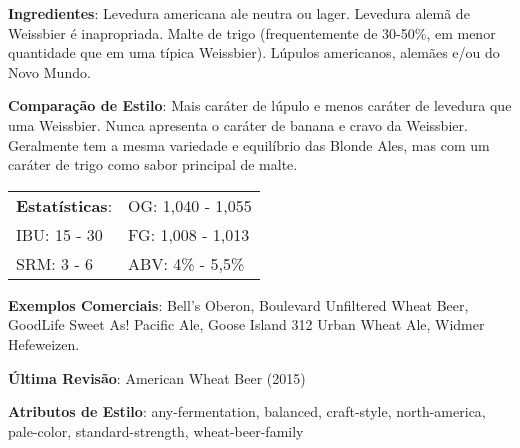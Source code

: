 \textbf{Ingredientes}: Levedura americana ale neutra ou lager. Levedura alemã de Weissbier é inapropriada. Malte de trigo (frequentemente de 30-50\%, em menor quantidade que em uma típica Weissbier). Lúpulos americanos, alemães e/ou do Novo Mundo.

\textbf{Comparação de Estilo}: Mais caráter de lúpulo e menos caráter de levedura que uma Weissbier. Nunca apresenta o caráter de banana e cravo da Weissbier. Geralmente tem a mesma variedade e equilíbrio das Blonde Ales, mas com um caráter de trigo como sabor principal de malte.

\begin{tabular}{@{}p{35mm}p{35mm}@{}}
  \textbf{Estatísticas}: & OG: 1,040 - 1,055 \\
  IBU: 15 - 30  & FG: 1,008 - 1,013 \\
  SRM: 3 - 6  & ABV: 4\% - 5,5\%
\end{tabular}

\textbf{Exemplos Comerciais}: Bell’s Oberon, Boulevard Unfiltered Wheat Beer, GoodLife Sweet As! Pacific Ale, Goose Island 312 Urban Wheat Ale, Widmer Hefeweizen.

\textbf{Última Revisão}: American Wheat Beer (2015)

\textbf{Atributos de Estilo}: any-fermentation, balanced, craft-style, north-america, pale-color, standard-strength, wheat-beer-family
